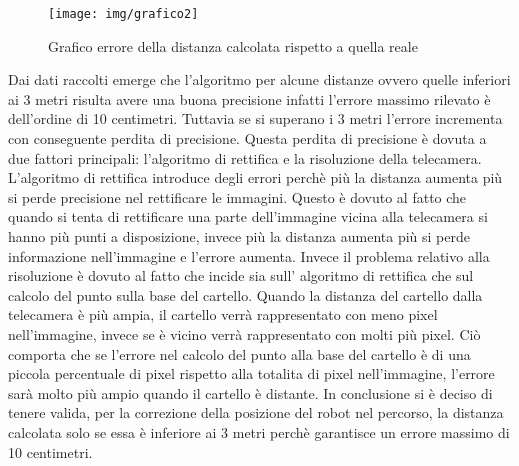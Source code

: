 	\begin{figure}[!ht]
		\centering
		\texttt{[image: img/grafico2]}
		\caption[Grafico errore calolo distanza]{Grafico errore della distanza calcolata rispetto a quella reale }
	\end{figure}

	Dai dati raccolti emerge che l'algoritmo per alcune distanze ovvero quelle inferiori ai 3 metri risulta avere una buona precisione infatti l'errore massimo rilevato è dell'ordine di 10 centimetri. Tuttavia se si superano i 3 metri l'errore incrementa con conseguente perdita di precisione. Questa perdita di precisione è dovuta a due fattori principali: l'algoritmo di rettifica e la risoluzione della telecamera. L'algoritmo di rettifica introduce degli errori perchè più la distanza aumenta più si perde precisione nel rettificare le immagini. Questo è dovuto al fatto che quando si tenta di rettificare una parte dell'immagine vicina alla telecamera si hanno più punti a disposizione, invece più la distanza aumenta più si perde informazione nell'immagine e l'errore aumenta. Invece il problema relativo alla risoluzione è dovuto al fatto che incide sia sull' algoritmo di rettifica che sul calcolo del punto sulla base del cartello. Quando la distanza del cartello dalla telecamera è più ampia, il cartello verrà rappresentato con meno pixel nell'immagine, invece se è vicino verrà rappresentato con molti più pixel. Ciò comporta che se l'errore nel calcolo del punto alla base del cartello è di una piccola percentuale di pixel rispetto alla totalita di pixel nell'immagine, l'errore sarà molto più ampio quando il cartello è distante.
	In conclusione si è deciso di tenere valida, per la correzione della posizione del robot nel percorso, la distanza calcolata solo se essa è inferiore ai 3 metri perchè garantisce un errore massimo di 10 centimetri. 





